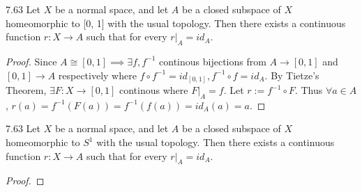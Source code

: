 \documentclass{article}
\begin{document}
\bigskip

\begin{claim}{7.63}\label{Claim 7.63.}
    Let $X$ be a normal space, and let $A$ be a closed subspace of $X$ homeomorphic to [0, 1] with the usual topology. Then there exists a continuous function $r: X \to A$ such that for every $r|_{A} = id_{A}$.
\end{claim}
\begin{proof}
    Since $A \cong [0, 1] \implies \exists f, f^{-1}$ continous bijections from $A \to [0, 1]$ and $[0, 1] \to A$ respectively where $f \circ f^{-1} = id_{[0, 1]}, f^{-1} \circ f = id_A$. By Tietze's Theorem, $\exists F: X \to [0, 1]$ continous where $F|_{A} = f$. Let $r:= f^{-1} \circ F$. Thus $\forall a \in A$, $r(a) = f^{-1}(F(a)) = f^{-1}(f(a)) = id_A(a) = a$.            
\end{proof}

\bigskip

\begin{claim}{7.63}\label{Claim 7.63.}
    Let $X$ be a normal space, and let $A$ be a closed subspace of $X$ homeomorphic to $S^1$  with the usual topology. Then there exists a continuous function $r: X \to A$ such that for every $r|_{A} = id_{A}$.
\end{claim}
\begin{proof}
\end{proof}

\bigskip
\end{document}
